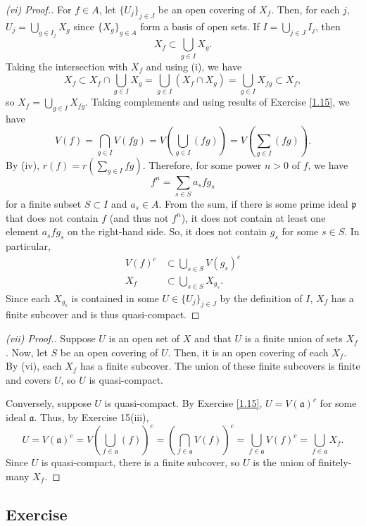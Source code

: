 \begin{proof}[(vi) Proof.]
For $f \in A$, let $\{U_j\}_{j \in J}$ be an open covering of $X_f$. Then, for each $j$, 
$U_j = \bigcup_{g \in I_j}X_g$ since $\{X_g\}_{g \in A}$ form a basis of open sets. If $I = \bigcup_{j \in J}I_j$, then
$$X_f \subset \bigcup_{g \in I}X_g.$$
Taking the intersection with $X_f$ and using (i), we have
$$X_f \subset X_f \cap \bigcup_{g \in I}X_g = \bigcup_{g \in I}(X_f \cap X_g) = \bigcup_{g \in I}X_{fg} \subset X_f,$$
so $X_f = \bigcup_{g \in I}X_{fg}$. Taking complements and using results of Exercise \ref{1.15}, we have
$$V(f) = \bigcap_{g \in I} V(fg) = V\left(\bigcup_{g \in I}(fg)\right) = V\left(\sum_{g \in I}(fg)\right).$$
By (iv), $r(f) = r\left(\sum_{g \in I}fg\right)$. Therefore, for some power $n>0$ of $f$, we have
$$f^n = \sum_{s \in S}a_s f g_s$$
for a finite subset $S \subset I$ and $a_s \in A$. From the sum, if there is some prime ideal $\mathfrak{p}$ that does not contain $f$ (and thus not $f^n$),
it does not contain at least one element $a_s f g_s$ on the right-hand side. So, it does not contain $g_s$ for some $s \in S$. In particular,
\begin{align*}
V(f)^c &\subset \bigcup_{s \in S}V(g_s)^c \\
X_f &\subset \bigcup_{s \in S}X_{g_s}.
\end{align*}
Since each $X_{g_s}$ is contained in some $U \in \{U_j\}_{j \in J}$ by the definition of $I$, $X_f$ has a finite subcover and is thus quasi-compact.
\end{proof}

\begin{proof}[(vii) Proof.]
Suppose $U$ is an open set of $X$ and that $U$ is a finite union of sets $X_f$. Now, let $S$ be an open covering of $U$. Then, it
is an open covering of each $X_f$. By (vi), each $X_f$ has a finite subcover. The union of these finite subcovers is finite and covers $U$, so 
$U$ is quasi-compact.

Conversely, suppose $U$ is quasi-compact. By Exercise \ref{1.15}, $U = V(\mathfrak{a})^c$ for some ideal $\mathfrak{a}$. Thus, by Exercise 15(iii),
$$U = V(\mathfrak{a})^c = V\left(\bigcup_{f \in \mathfrak{a}}(f)\right)^c = \left(\bigcap_{f \in \mathfrak{a}}V(f)\right)^c
= \bigcup_{f \in \mathfrak{a}}V(f)^c = \bigcup_{f \in \mathfrak{a}}X_f.$$
Since $U$ is quasi-compact, there is a finite subcover, so $U$ is the union of finitely-many $X_f$.
\end{proof}

\subsection{Exercise}\label{1.18}

